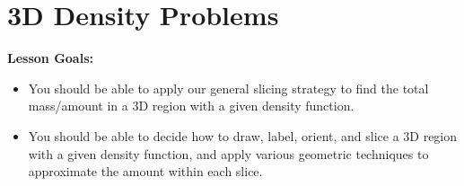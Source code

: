 \documentclass[main]{subfiles}
\begin{document}
\ifSubfilesClassLoaded{%
  \chaptermark{\chapterone}
}{}

\section{3D Density Problems} \label{ws1-5}

\begin{framed}
\textbf{Lesson Goals:}
\begin{itemize}
\item You should be able to apply our general slicing strategy to find the total mass/amount in a 3D region with a given density function.
\item You should be able to decide how to draw, label, orient, and slice a 3D region with a given density function, and apply various geometric techniques to approximate the amount within each slice. 
\end{itemize}
\end{framed}
\end{document}
